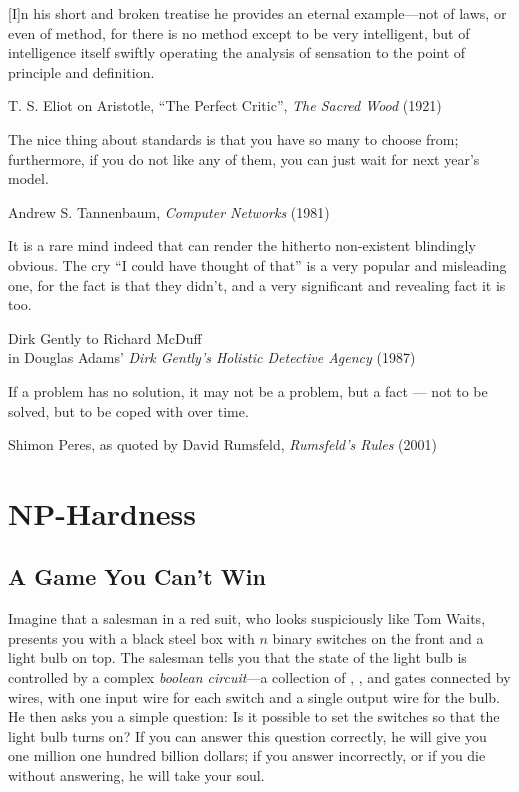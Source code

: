 \epigraph{[I]n his short and broken treatise he provides an eternal example---not of laws, or even of method, for there is no method except to be very intelligent, but of intelligence itself swiftly operating the analysis of sensation to the point of principle and definition.}{T. S. Eliot on Aristotle, “The Perfect Critic”, \textit{The Sacred Wood} (1921)}

\epigraph{The nice thing about standards is that you have so many to choose from; furthermore, if you do not like any of them, you can just wait for next year’s model.}{Andrew S. Tannenbaum, \textit{Computer Networks} (1981)}

\epigraph{It is a rare mind indeed that can render the hitherto non-existent blindingly obvious. The cry “I could have thought of that” is a very popular and misleading one, for the fact is that they didn’t, and a very significant and revealing fact it is too.}{Dirk Gently to Richard McDuff\\in Douglas Adams’ \textit{Dirk Gently’s Holistic Detective Agency} (1987)}

\epigraph{If a problem has no solution, it may not be a problem, but a fact --- not to be solved, but to be coped with over time.}{Shimon Peres, as quoted by David Rumsfeld, \textit{Rumsfeld’s Rules} (2001)}

\chapter{NP-Hardness}
\label{ch:12}

\section{A Game You Can't Win}
\label{sec:12.1}

Imagine that a salesman in a red suit, who looks suspiciously like Tom Waits, presents you with a black steel box with $n$ binary switches on the front and a light bulb on top.
The salesman tells you that the state of the light bulb is controlled by a complex \textit{boolean circuit}---a collection of , , and  gates connected by wires, with one input wire for each switch and a single output wire for the bulb.
He then asks you a simple question: Is it possible to set the switches so that the light bulb turns on?
If you can answer this question correctly, he will give you one million one hundred billion dollars; if you answer incorrectly, or if you die without answering, he will take your soul.

